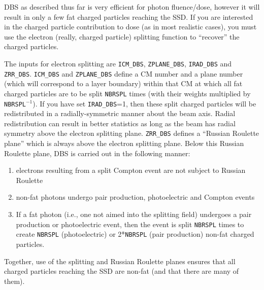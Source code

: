 \documentclass[12pt,twoside]{article}
\begin{document}
DBS as described thus far is very efficient for photon fluence/dose, however
it will result in only a few fat charged particles reaching the SSD.
If you are interested in the charged particle contribution to dose
(as in most realistic cases), you must use
the electron (really, charged particle) splitting function to
``recover'' the charged particles.

The inputs for electron splitting are {\tt ICM\_DBS}, {\tt ZPLANE\_DBS},
{\tt IRAD\_DBS} and {\tt ZRR\_DBS}.  {\tt ICM\_DBS} and {\tt ZPLANE\_DBS}
define a CM number and a plane number (which will correspond to a layer
boundary) within that CM at which all fat charged particles are to be
split {\tt NBRSPL} times (with their weights multiplied by
{\tt NBRSPL}$^{-1}$).  If you have set {\tt IRAD\_DBS}=1, then these
split charged particles will be redistributed in a radially-symmetric
manner about the beam axis.  Radial redistribution can result in
better statistics as long as the beam has radial symmetry above the
electron splitting plane.  {\tt ZRR\_DBS}
defines a ``Russian Roulette plane'' which is always above the
electron splitting plane. Below this Russian Roulette plane, DBS is carried out
in the following manner:
\vspace*{-4mm}
\begin{enumerate}
\item electrons resulting from a split Compton event are not
subject to Russian Roulette
\item non-fat photons undergo pair production, photoelectric
and Compton events
\item If a fat photon (i.e., one not aimed into the splitting field) undergoes a
pair production or photoelectric event, then the event is split
{\tt NBRSPL} times to create {\tt NBRSPL} (photoelectric) or 2*{\tt NBRSPL} (pair
production) non-fat charged particles.
\end{enumerate}
\vspace*{-4mm}
Together, use of the splitting and Russian Roulette planes ensures that
all charged particles reaching the SSD are non-fat (and that there are many of
them).
\end{document}
